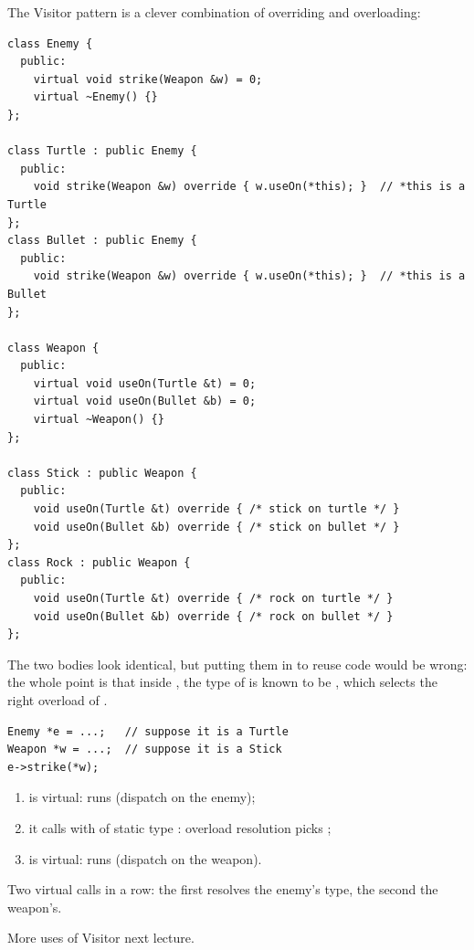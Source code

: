 The Visitor pattern is a clever combination of overriding and overloading:
\begin{lstlisting}[style=cpp]
class Enemy {
  public:
    virtual void strike(Weapon &w) = 0;
    virtual ~Enemy() {}
};

class Turtle : public Enemy {
  public:
    void strike(Weapon &w) override { w.useOn(*this); }  // *this is a Turtle
};
class Bullet : public Enemy {
  public:
    void strike(Weapon &w) override { w.useOn(*this); }  // *this is a Bullet
};

class Weapon {
  public:
    virtual void useOn(Turtle &t) = 0;
    virtual void useOn(Bullet &b) = 0;
    virtual ~Weapon() {}
};

class Stick : public Weapon {
  public:
    void useOn(Turtle &t) override { /* stick on turtle */ }
    void useOn(Bullet &b) override { /* stick on bullet */ }
};
class Rock : public Weapon {
  public:
    void useOn(Turtle &t) override { /* rock on turtle */ }
    void useOn(Bullet &b) override { /* rock on bullet */ }
};
\end{lstlisting}
The two  bodies look identical, but putting them in 
to reuse code would be wrong: the whole point is that inside , the
type of  is known to be , which selects the right
overload of .

\begin{lstlisting}[style=cpp]
Enemy *e = ...;   // suppose it is a Turtle
Weapon *w = ...;  // suppose it is a Stick
e->strike(*w);
\end{lstlisting}
\begin{enumerate}
  \item {} is virtual:  runs (dispatch on the
        enemy);
  \item it calls  with  of static type
        : overload resolution picks ;
  \item {} is virtual:  runs (dispatch on
        the weapon).
\end{enumerate}
\begin{center}

\small Two virtual calls in a row: the first resolves the enemy's type, the second the weapon's.
\end{center}
More uses of Visitor next lecture.


